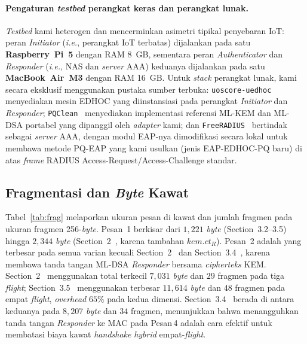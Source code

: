 \documentclass{easychair}
\newcommand{\VarSec}[1]{Section~#1~\cite{pq-edhoc-draft}}
\begin{document}
\paragraph{Pengaturan \emph{testbed} perangkat keras dan perangkat lunak.}
\emph{Testbed} kami heterogen dan mencerminkan asimetri tipikal
penyebaran IoT: peran \emph{Initiator} (\emph{i.e.}, perangkat IoT
terbatas) dijalankan pada satu \textbf{Raspberry~Pi~5} dengan RAM
8~GB, sementara peran \emph{Authenticator} dan \emph{Responder}
(\emph{i.e.}, NAS dan \emph{server} AAA) keduanya dijalankan pada
satu \textbf{MacBook~Air~M3} dengan RAM 16~GB. Untuk \emph{stack}
perangkat lunak, kami secara eksklusif menggunakan pustaka sumber
terbuka: \texttt{uoscore-uedhoc}~\cite{uoscore} menyediakan mesin
EDHOC yang diinstansiasi pada perangkat \emph{Initiator} dan
\emph{Responder}; \texttt{PQClean}~\cite{pqclean} menyediakan
implementasi referensi ML-KEM dan ML-DSA portabel yang dipanggil
oleh \emph{adapter} kami; dan \texttt{FreeRADIUS}~\cite{freeradius}
bertindak sebagai \emph{server} AAA, dengan modul EAP-nya
dimodifikasi secara lokal untuk membawa metode PQ-EAP yang kami
usulkan (jenis EAP-EDHOC-PQ baru) di atas \emph{frame} RADIUS
Access-Request/Access-Challenge standar.

\subsection{Fragmentasi dan \emph{Byte} Kawat}
Tabel~\ref{tab:frag} melaporkan ukuran pesan di kawat dan jumlah
fragmen pada ukuran fragmen 256-\emph{byte}. Pesan~1 berkisar dari
$1{,}221$ \emph{byte} (Section~3.2--3.5) hingga $2{,}344$ \emph{byte}
(\VarSec{2}, karena tambahan $\mathit{kem.ct}_R$). Pesan~2 adalah
yang terbesar pada semua varian kecuali \VarSec{2} dan \VarSec{3.4},
karena membawa tanda tangan ML-DSA \emph{Responder} bersama
\emph{cipherteks} KEM. \VarSec{2} menggunakan total terkecil
$7{,}031$ \emph{byte} dan $29$ fragmen pada tiga \emph{flight};
\VarSec{3.5} menggunakan terbesar $11{,}614$ \emph{byte} dan $48$
fragmen pada empat \emph{flight}, \emph{overhead} $65\%$ pada kedua
dimensi. \VarSec{3.4} berada di antara keduanya pada $8{,}207$
\emph{byte} dan $34$ fragmen, menunjukkan bahwa menangguhkan tanda
tangan \emph{Responder} ke MAC pada Pesan\,4 adalah cara efektif
untuk membatasi biaya kawat \emph{handshake} \emph{hybrid} empat-\emph{flight}.
\end{document}
